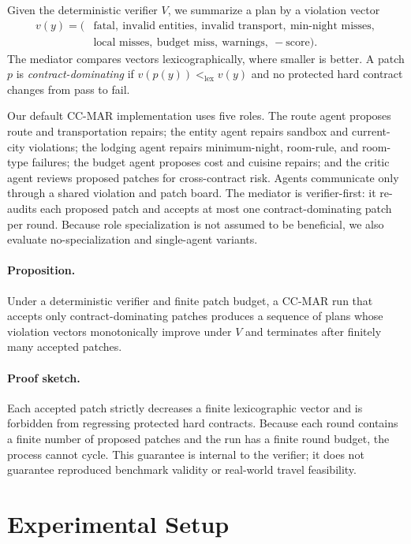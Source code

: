 \documentclass{article}
\begin{document}
Given the deterministic verifier $V$, we summarize a plan by a violation vector
\[
\begin{aligned}
v(y) = (&\text{fatal},\ \text{invalid entities},\ \text{invalid transport},\
\text{min-night misses},\\
&\text{local misses},\ \text{budget miss},\ \text{warnings},\ -\text{score}).
\end{aligned}
\]
The mediator compares vectors lexicographically, where smaller is better. A patch $p$ is \emph{contract-dominating} if $v(p(y)) <_{\mathrm{lex}} v(y)$ and no protected hard contract changes from pass to fail.

Our default CC-MAR implementation uses five roles. The route agent proposes route and transportation repairs; the entity agent repairs sandbox and current-city violations; the lodging agent repairs minimum-night, room-rule, and room-type failures; the budget agent proposes cost and cuisine repairs; and the critic agent reviews proposed patches for cross-contract risk. Agents communicate only through a shared violation and patch board. The mediator is verifier-first: it re-audits each proposed patch and accepts at most one contract-dominating patch per round. Because role specialization is not assumed to be beneficial, we also evaluate no-specialization and single-agent variants.

\paragraph{Proposition.}
Under a deterministic verifier and finite patch budget, a CC-MAR run that accepts only contract-dominating patches produces a sequence of plans whose violation vectors monotonically improve under $V$ and terminates after finitely many accepted patches.

\paragraph{Proof sketch.}
Each accepted patch strictly decreases a finite lexicographic vector and is forbidden from regressing protected hard contracts. Because each round contains a finite number of proposed patches and the run has a finite round budget, the process cannot cycle. This guarantee is internal to the verifier; it does not guarantee reproduced benchmark validity or real-world travel feasibility.

\section{Experimental Setup}
\end{document}
